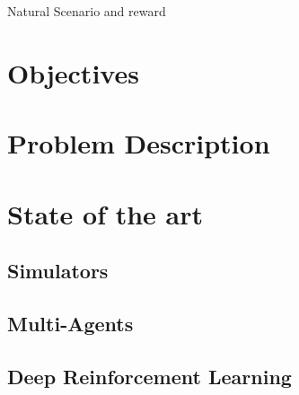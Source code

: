 Natural Scenario and reward

\section{Objectives}

\section{Problem Description}

\section{State of the art}

\subsection{Simulators}

\subsection{Multi-Agents}

\subsection{Deep Reinforcement Learning}

